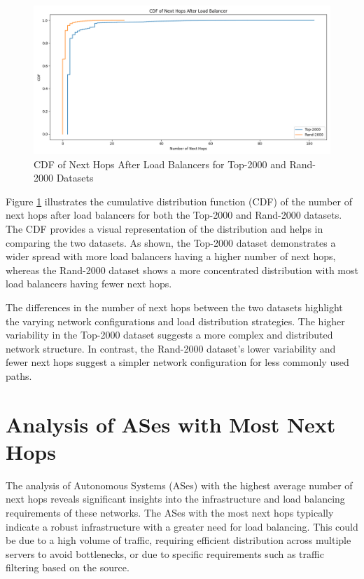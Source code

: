 \documentclass[12pt]{cwru_thesis}
\begin{document}
\begin{figure}[h]
    \centering
    \includegraphics[width=\linewidth]{figures/cdf_next_hops.png}
    \caption{CDF of Next Hops After Load Balancers for Top-2000 and Rand-2000 Datasets}
    \label{fig:cdf_next_hops}
\end{figure}

Figure \ref{fig:cdf_next_hops} illustrates the cumulative distribution function (CDF) of the number of next hops after load balancers for both the Top-2000 and Rand-2000 datasets. The CDF provides a visual representation of the distribution and helps in comparing the two datasets. As shown, the Top-2000 dataset demonstrates a wider spread with more load balancers having a higher number of next hops, whereas the Rand-2000 dataset shows a more concentrated distribution with most load balancers having fewer next hops.



The differences in the number of next hops between the two datasets highlight the varying network configurations and load distribution strategies. The higher variability in the Top-2000 dataset suggests a more complex and distributed network structure. In contrast, the Rand-2000 dataset's lower variability and fewer next hops suggest a simpler network configuration for less commonly used paths.

\section{Analysis of ASes with Most Next Hops}

The analysis of Autonomous Systems (ASes) with the highest average number of next hops reveals significant insights into the infrastructure and load balancing requirements of these networks. The ASes with the most next hops typically indicate a robust infrastructure with a greater need for load balancing. This could be due to a high volume of traffic, requiring efficient distribution across multiple servers to avoid bottlenecks, or due to specific requirements such as traffic filtering based on the source.
\end{document}
